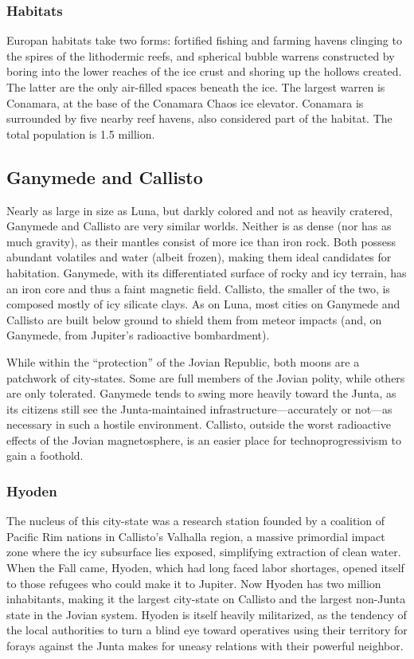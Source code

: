 \subsubsection{Habitats} \label{sec:habitats-4} 

Europan habitats take two forms: fortified fishing and farming havens clinging to the spires of the lithodermic reefs, and spherical bubble warrens constructed by boring into the lower reaches of the ice crust and shoring up the hollows created. The latter are the only air-filled spaces beneath the ice. The largest warren is Conamara, at the base of the Conamara Chaos ice elevator. Conamara is surrounded by five nearby reef havens, also considered part of the habitat. The total population is 1.5 million. 

\subsection{Ganymede and Callisto} \label{sec:ganymede-callisto} 

Nearly as large in size as Luna, but darkly colored and not as heavily cratered, Ganymede and Callisto are very similar worlds. Neither is as dense (nor has as much gravity), as their mantles consist of more ice than iron rock. Both possess abundant volatiles and water (albeit frozen), making them ideal candidates for habitation. Ganymede, with its differentiated surface of rocky and icy terrain, has an iron core and thus a faint magnetic field. Callisto, the smaller of the two, is composed mostly of icy silicate clays. As on Luna, most cities on Ganymede and Callisto are built below ground to shield them from meteor impacts (and, on Ganymede, from Jupiter's radioactive bombardment). 

While within the “protection” of the Jovian Republic, both moons are a patchwork of city-states. Some are full members of the Jovian polity, while others are only tolerated. Ganymede tends to swing more heavily toward the Junta, as its citizens still see the Junta-maintained infrastructure—accurately or not—as necessary in such a hostile environment. Callisto, outside the worst radioactive effects of the Jovian magnetosphere, is an easier place for technoprogressivism to gain a foothold. 

\subsubsection{Hyoden} \label{sec:hyoden} 

The nucleus of this city-state was a research station founded by a coalition of Pacific Rim nations in Callisto's Valhalla region, a massive primordial impact zone where the icy subsurface lies exposed, simplifying extraction of clean water. When the Fall came, Hyoden, which had long faced labor shortages, opened itself to those refugees who could make it to Jupiter. Now Hyoden has two million inhabitants, making it the largest city-state on Callisto and the largest non-Junta state in the Jovian system. Hyoden is itself heavily militarized, as the tendency of the local authorities to turn a blind eye toward operatives using their territory for forays against the Junta makes for uneasy relations with their powerful neighbor. 

